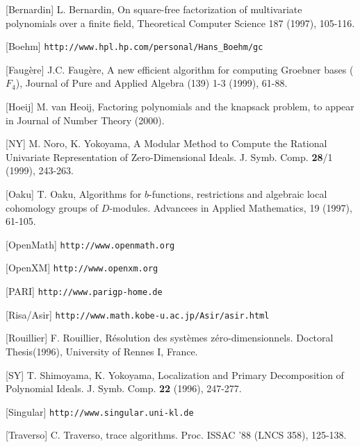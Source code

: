 \begin{slide}{}

[Bernardin] L. Bernardin, On square-free factorization of 
multivariate polynomials over a finite field, Theoretical
Computer Science 187 (1997), 105-116.

[Boehm] {\tt http://www.hpl.hp.com/personal/Hans\_Boehm/gc}

[Faug\`ere] J.C. Faug\`ere,
A new efficient algorithm for computing Groebner bases  ($F_4$),
Journal of Pure and Applied Algebra (139) 1-3 (1999), 61-88.

[Hoeij] M. van Heoij, Factoring polynomials and the knapsack problem,
to appear in Journal of Number Theory (2000).

[NY] M. Noro, K. Yokoyama, 
A Modular Method to Compute the Rational Univariate
Representation of Zero-Dimensional Ideals.
J. Symb. Comp. {\bf 28}/1 (1999), 243-263.

[Oaku] T. Oaku, Algorithms for $b$-functions, restrictions and algebraic
local cohomology groups of $D$-modules.
Advancees in Applied Mathematics, 19 (1997), 61-105.
\end{slide}

\begin{slide}{}

[OpenMath] {\tt http://www.openmath.org}

[OpenXM] {\tt http://www.openxm.org}

[PARI] {\tt http://www.parigp-home.de}

[Risa/Asir] {\tt http://www.math.kobe-u.ac.jp/Asir/asir.html}

[Rouillier] F. Rouillier,
R\'esolution des syst\`emes z\'ero-dimensionnels. 
Doctoral Thesis(1996), University of Rennes I, France.

[SY] T. Shimoyama, K. Yokoyama, Localization and Primary Decomposition of Polynomial Ideals.  J. Symb. Comp. {\bf 22} (1996), 247-277.

[Singular] {\tt http://www.singular.uni-kl.de}

[Traverso] C. Traverso, \gr trace algorithms. Proc. ISSAC '88 (LNCS 358), 125-138.

\end{slide}

\begin{slide}{}
\begin{center}
\end{center}
\end{slide}

